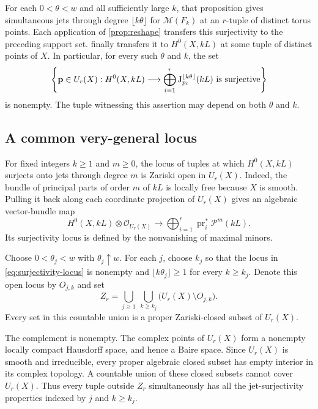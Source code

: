 For each $0<\theta<w$ and all sufficiently large $k$, that proposition gives simultaneous jets through degree $\lfloor k\theta\rfloor$ for $\mathcal{M}(F_k)$ at an $r$-tuple of distinct torus points. Each application of \cref{prop:reshape} transfers this surjectivity to the preceding support set.  finally transfers it to $H^0(X,kL)$ at some tuple of distinct points of $X$. In particular, for every such $\theta$ and $k$, the set
\begin{equation}
 \label{eq:surjectivity-locus}
 \left\{\mathbf{p}\in U_r(X):
 H^0(X,kL)\longrightarrow
 \bigoplus_{i=1}^r\mathrm J_{p_i}^{\lfloor k\theta\rfloor}(kL)
 \text{ is surjective}\right\}
\end{equation}
is nonempty. The tuple witnessing this assertion may depend on both $\theta$ and $k$.

\subsection{A common very-general locus}

For fixed integers $k\ge1$ and $m\ge0$, the locus of tuples at which $H^0(X,kL)$ surjects onto jets through degree $m$ is Zariski open in $U_r(X)$. Indeed, the bundle of principal parts of order $m$ of $kL$ is locally free because $X$ is smooth. Pulling it back along each coordinate projection of $U_r(X)$ gives an algebraic vector-bundle map
\[
 H^0(X,kL)\otimes\mathcal{O}_{U_r(X)}
 \longrightarrow
 \bigoplus_{i=1}^r\operatorname{pr}_i^*\mathcal{P}^m(kL).
\]
Its surjectivity locus is defined by the nonvanishing of maximal minors.

Choose $0<\theta_j<w$ with $\theta_j\uparrow w$. For each $j$, choose $k_j$ so that the locus in \eqref{eq:surjectivity-locus} is nonempty and $\lfloor k\theta_j\rfloor\ge1$ for every $k\ge k_j$. Denote this open locus by $O_{j,k}$ and set
\begin{equation}
 \label{eq:exceptional-set}
 Z_r=\bigcup_{j\ge1}\ \bigcup_{k\ge k_j}
       \bigl(U_r(X)\setminus O_{j,k}\bigr).
\end{equation}
Every set in this countable union is a proper Zariski-closed subset of $U_r(X)$.

The complement is nonempty. The complex points of $U_r(X)$ form a nonempty locally compact Hausdorff space, and hence a Baire space. Since $U_r(X)$ is smooth and irreducible, every proper algebraic closed subset has empty interior in its complex topology. A countable union of these closed subsets cannot cover $U_r(X)$. Thus every tuple outside $Z_r$ simultaneously has all the jet-surjectivity properties indexed by $j$ and $k\ge k_j$.

